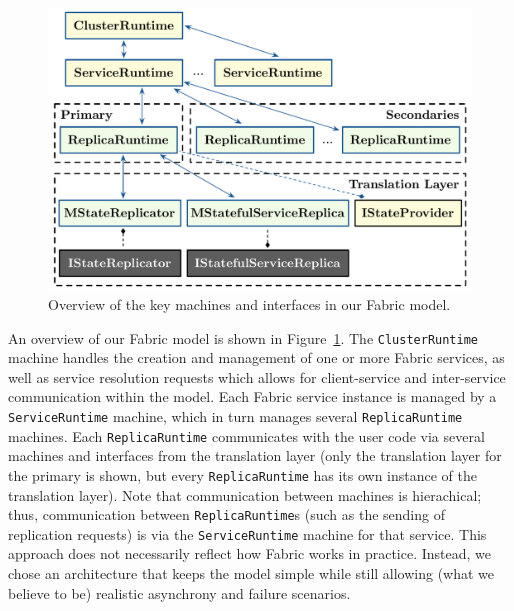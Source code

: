 \begin{figure}[thb]
\centering
\includegraphics[width=\linewidth]{img/fabricmodel}
\caption{Overview of the key machines and interfaces in our Fabric model.}
\label{fig:fabric_model}
\end{figure}

An overview of our Fabric model is shown in Figure~\ref{fig:fabric_model}.
The \texttt{ClusterRuntime} machine 
handles the creation and management of 
one or more Fabric services,
as well as service resolution requests
which allows for client-service and inter-service communication
within the model.
Each Fabric service instance is managed by a \texttt{ServiceRuntime}
machine, which in turn manages 
several \texttt{ReplicaRuntime} machines.
Each \texttt{ReplicaRuntime} communicates with the user code
via several machines and interfaces from the translation layer
(only the translation layer for the primary is shown,
but every \texttt{ReplicaRuntime} has its own instance of the translation layer).
Note that communication between machines is hierachical;
thus, communication between \texttt{ReplicaRuntime}s
(such as the sending of replication requests)
is via the \texttt{ServiceRuntime} machine for that service.
This approach does not necessarily reflect how Fabric works in practice.
Instead, we chose an architecture
that keeps the model simple
while still allowing (what we believe to be) realistic
asynchrony and failure scenarios.

